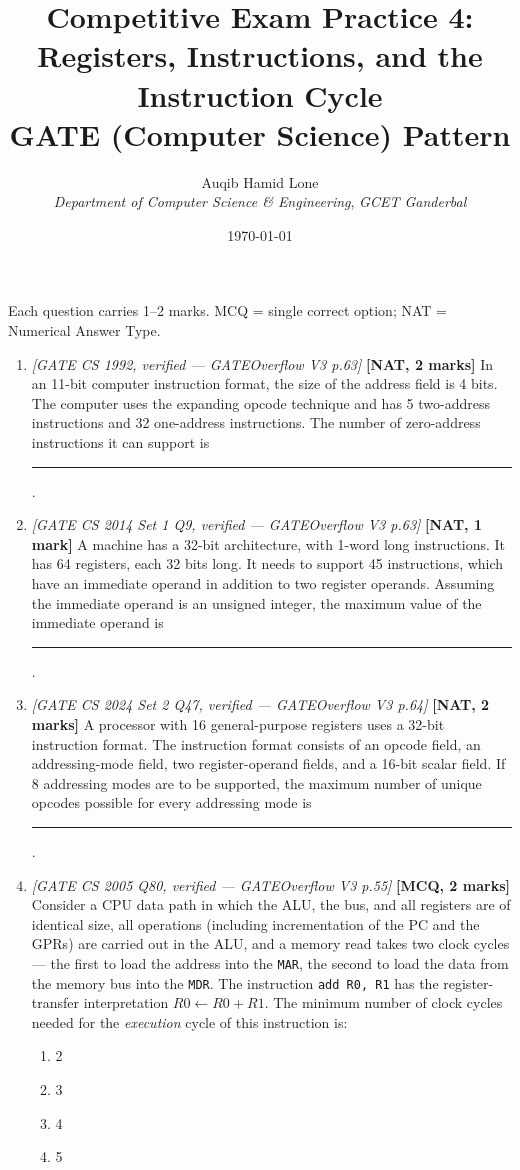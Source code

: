 \documentclass[11pt]{article}
\title{Competitive Exam Practice 4: Registers, Instructions, and the Instruction Cycle\\\large GATE (Computer Science) Pattern}
\author{Auqib Hamid Lone\\[0.3em]
  \emph{Department of Computer Science \& Engineering}, \emph{GCET Ganderbal}}
\date{\today}
\begin{document}
\maketitle

\noindent Each question carries 1--2 marks. MCQ = single correct option; NAT = Numerical Answer Type.

\begin{enumerate}
\item[\textbf{Q1}] \textit{[GATE CS 1992, verified --- GATEOverflow V3 p.63]} \textbf{[NAT, 2 marks]} In an 11-bit computer instruction format, the size of the address field is 4 bits. The computer uses the expanding opcode technique and has 5 two-address instructions and 32 one-address instructions. The number of zero-address instructions it can support is \rule{1.5cm}{0.4pt}.

\item[\textbf{Q2}] \textit{[GATE CS 2014 Set 1 Q9, verified --- GATEOverflow V3 p.63]} \textbf{[NAT, 1 mark]} A machine has a 32-bit architecture, with 1-word long instructions. It has 64 registers, each 32 bits long. It needs to support 45 instructions, which have an immediate operand in addition to two register operands. Assuming the immediate operand is an unsigned integer, the maximum value of the immediate operand is \rule{1.5cm}{0.4pt}.

\item[\textbf{Q3}] \textit{[GATE CS 2024 Set 2 Q47, verified --- GATEOverflow V3 p.64]} \textbf{[NAT, 2 marks]} A processor with 16 general-purpose registers uses a 32-bit instruction format. The instruction format consists of an opcode field, an addressing-mode field, two register-operand fields, and a 16-bit scalar field. If 8 addressing modes are to be supported, the maximum number of unique opcodes possible for every addressing mode is \rule{1.5cm}{0.4pt}.

\item[\textbf{Q4}] \textit{[GATE CS 2005 Q80, verified --- GATEOverflow V3 p.55]} \textbf{[MCQ, 2 marks]} Consider a CPU data path in which the ALU, the bus, and all registers are of identical size, all operations (including incrementation of the PC and the GPRs) are carried out in the ALU, and a memory read takes two clock cycles --- the first to load the address into the \texttt{MAR}, the second to load the data from the memory bus into the \texttt{MDR}. The instruction \texttt{add R0, R1} has the register-transfer interpretation $R0 \gets R0 + R1$. The minimum number of clock cycles needed for the \emph{execution} cycle of this instruction is:
\begin{enumerate}
  \item[(A)] 2
  \item[(B)] 3
  \item[(C)] 4
  \item[(D)] 5
\end{enumerate}


\end{enumerate}
\end{document}
